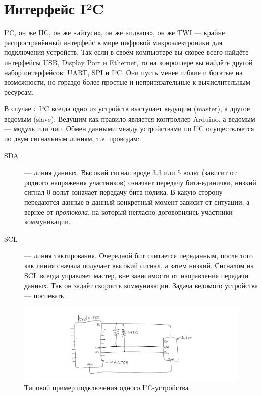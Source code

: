 \section{Интерфейс I²C}
\label{I2C}

I²C, он же IIC, он же «айтуси», он же «идвацэ», он же TWI — крайне распространённый интерфейс в мире цифровой микроэлектроники для подключения устройств. Так если в своём компьютере вы скорее всего найдёте интерфейсы USB, Display Port и Ethernet, то на конроллере вы найдёте другой набор интерфейсов: UART, SPI и I²C. Они пусть менее гибкие и богатые на возможности, но гораздо более простые и непритязательные к вычислительным ресурсам.

В случае с I²C всегда одно из устройств выступает ведущим (master), а другое ведомым (slave). Ведущим как правило является контроллер Arduino, а ведомым — модуль или чип. Обмен данными между устройствами по I²C осуществляется по двум сигнальным линиям, т.е. проводам:

\begin{description}
  \item [SDA] — линия данных. Высокий сигнал вроде 3.3 или 5 вольт (зависит от родного напряжения участников) означает передачу бита-единички, низкий сигнал 0 вольт означает передачу бита-нолика. В какую сторону передаются данные в данный конкретный момент зависит от ситуации, а вернее от \emph{протокола}, на который негласно договорились участники коммуникации.
  \item [SCL] — линия тактирования. Очередной бит считается переданным, после того как линия сначала получает высокий сигнал, а затем низкий. Сигналом на SCL всегда управляет мастер, вне зависимости от направления передачи данных. Так он задаёт скорость коммуникации. Задача ведомого устройства — поспевать.
\end{description}

\begin{figure}
  \centering
  \includegraphics{sketches/i2c-single}
  \caption{Типовой пример подключения одного I²C-устройства}
\end{figure}

